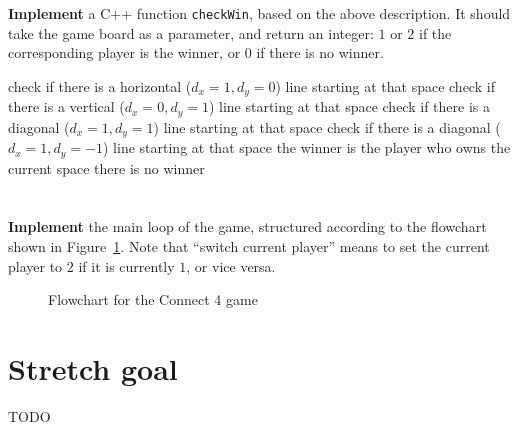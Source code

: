 \textbf{Implement} a C++ function \texttt{checkWin}, based on the above description.
It should take the game board as a parameter, and return an integer:
$1$ or $2$ if the corresponding player is the winner,
or $0$ if there is no winner.


\begin{algorithm}
\begin{algorithmic}
        \State check if there is a horizontal ($d_x=1, d_y=0$) line starting at that space
        \State check if there is a vertical ($d_x=0, d_y=1$) line starting at that space
        \State check if there is a diagonal ($d_x=1, d_y=1$) line starting at that space
        \State check if there is a diagonal ($d_x=1, d_y=-1$) line starting at that space
            \State the winner is the player who owns the current space
        \EndIf
    \EndFor
        \State there is no winner
    \EndIf
\end{algorithmic}
\end{algorithm}

\section{} \label{core-b-last}

\textbf{Implement} the main loop of the game, structured
according to the flowchart shown in Figure~\ref{fig:flowchart_b}.
Note that ``switch current player'' means to set the current player to $2$ if it is currently $1$, or vice versa.

\begin{figure}
\begin{center}
\end{center}
\caption{Flowchart for the Connect 4 game}
\label{fig:flowchart_b}
\end{figure}

\section{Stretch goal} \label{stretch-b}

TODO
